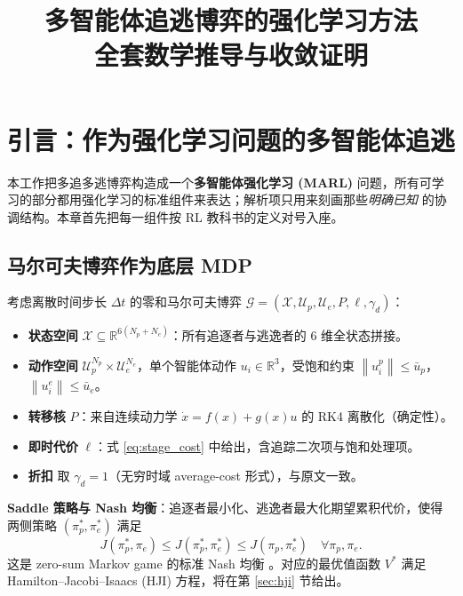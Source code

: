 \documentclass[11pt,a4paper]{article}
\title{多智能体追逃博弈的强化学习方法\\全套数学推导与收敛证明}
\author{}
\date{}
\newcommand{\R}{\mathbb{R}}
\newcommand{\ubar}{\bar{u}}
\newcommand{\norm}[1]{\left\lVert #1 \right\rVert}
\theoremstyle{remark}
\begin{document}
\maketitle
\tableofcontents
\bigskip

\section{引言：作为强化学习问题的多智能体追逃}

本工作把多追多逃博弈构造成一个\textbf{多智能体强化学习 (MARL)} 问题，所有可学习的部分都用强化学习的标准组件来表达；解析项只用来刻画那些\emph{明确已知} 的协调结构。本章首先把每一组件按 RL 教科书的定义对号入座。

\subsection{马尔可夫博弈作为底层 MDP}

考虑离散时间步长 $\Delta t$ 的零和马尔可夫博弈 $\mathcal G=(\mathcal X,\mathcal U_p,\mathcal U_e,P,\ell,\gamma_d)$：
\begin{itemize}
\item \textbf{状态空间} $\mathcal X\subseteq\R^{6(N_p+N_e)}$：所有追逐者与逃逸者的 6 维全状态拼接。
\item \textbf{动作空间} $\mathcal U_p^{N_p}\times\mathcal U_e^{N_e}$，单个智能体动作 $u_i\in\R^3$，受饱和约束 $\norm{u_i^p}\le\ubar_p$，$\norm{u_i^e}\le\ubar_e$。
\item \textbf{转移核} $P$：来自连续动力学 $\dot x = f(x)+g(x)u$ 的 RK4 离散化（确定性）。
\item \textbf{即时代价} $\ell$：式 \eqref{eq:stage_cost} 中给出，含追踪二次项与饱和处理项。
\item \textbf{折扣} 取 $\gamma_d=1$（无穷时域 average-cost 形式），与原文一致。
\end{itemize}

\textbf{Saddle 策略与 Nash 均衡}：追逐者最小化、逃逸者最大化期望累积代价，使得两侧策略 $(\pi_p^*,\pi_e^*)$ 满足
\begin{equation}
J(\pi_p^*,\pi_e)\le J(\pi_p^*,\pi_e^*)\le J(\pi_p,\pi_e^*)\quad\forall\pi_p,\pi_e.
\end{equation}
这是 zero-sum Markov game 的标准 Nash 均衡 \cite{shapley1953}。对应的最优值函数 $V^*$ 满足 Hamilton--Jacobi--Isaacs (HJI) 方程，将在第 \ref{sec:hji} 节给出。
\end{document}
